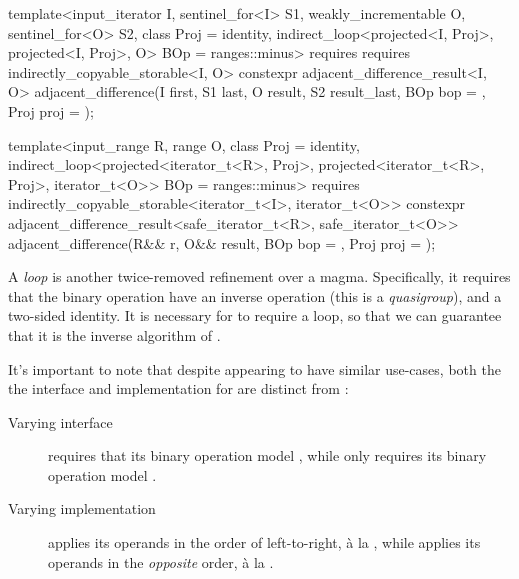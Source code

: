 \begin{itemdecl}
template<input_iterator I, sentinel_for<I> S1, weakly_incrementable O, sentinel_for<O> S2,
         class Proj = identity,
         indirect_loop<projected<I, Proj>, projected<I, Proj>, O> BOp = ranges::minus>
  requires requires indirectly_copyable_storable<I, O>
constexpr adjacent_difference_result<I, O>
  adjacent_difference(I first, S1 last, O result, S2 result_last, BOp bop = {}, Proj proj = {});

template<input_range R, range O, class Proj = identity,
         indirect_loop<projected<iterator_t<R>, Proj>,
                       projected<iterator_t<R>, Proj>,
                       iterator_t<O>> BOp = ranges::minus>
  requires indirectly_copyable_storable<iterator_t<I>, iterator_t<O>>
constexpr adjacent_difference_result<safe_iterator_t<R>, safe_iterator_t<O>>
  adjacent_difference(R&& r, O&& result, BOp bop = {}, Proj proj = {});
\end{itemdecl}
\begin{itemdescr}
   \pnum
   A \textit{loop} is another twice-removed refinement over a magma. Specifically, it requires that
   the binary operation have an inverse operation (this is a
   \textit{quasigroup}\cite{wikipedia_quasigroup}), and a two-sided identity. It is necessary for
    to require a loop, so that we can guarantee that it is the inverse
   algorithm of .

   It's important to note that despite appearing to have similar use-cases, both the the interface
   and implementation for  are distinct from
   :

   \begin{description}
      \item[Varying interface]
          requires that its binary operation model
         , while  only
         requires its binary operation model
         .
      \item[Varying implementation]
          applies its operands in the order of left-to-right, \`{a} la
         , while  applies its operands in the
         \textit{opposite} order, \`{a} la .
   \end{description}
\end{itemdescr}

